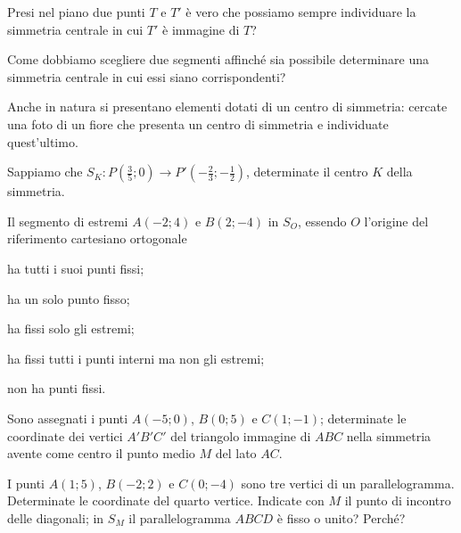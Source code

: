 \begin{esercizio}
\label{ese:8.4}
Presi nel piano due punti $T$ e $T'$ è vero che possiamo sempre 
individuare la simmetria centrale in cui $T'$ è immagine di $T$?
\end{esercizio}

\begin{esercizio}
\label{ese:8.5}
Come dobbiamo scegliere due segmenti affinché sia possibile 
determinare una simmetria centrale in cui essi siano corrispondenti?
\end{esercizio}

\begin{esercizio}
\label{ese:8.6}
Anche in natura si presentano elementi dotati di un centro di 
simmetria: cercate una foto di un fiore che presenta un centro di 
simmetria e individuate quest'ultimo.
\end{esercizio}

\begin{esercizio}
\label{ese:8.7}
Sappiamo che $S_K:P\left(\frac{3}{5};0\right) \rightarrow 
P'\left(-\frac{2}{3};-\frac{1}{2}\right)$, determinate il centro $K$ 
della simmetria. 
\end{esercizio}

\begin{esercizio}
\label{ese:8.8}
Il segmento di estremi $A(-2;4)$ e $B(2;-4)$ in $S_O$, essendo $O$ 
l'origine del riferimento cartesiano ortogonale
\begin{enumeratea}
\item ha tutti i suoi punti fissi;
\item ha un solo punto fisso;
\item ha fissi solo gli estremi;
\item ha fissi tutti i punti interni ma non gli estremi;
\item non ha punti fissi.
\end{enumeratea}
\end{esercizio}

\begin{esercizio}
\label{ese:8.9}
Sono assegnati i punti $A(-5;0)$, $B(0;5)$ e $C(1;-1)$; determinate 
le coordinate dei vertici $A'B'C'$ del triangolo immagine di $ABC$ 
nella simmetria avente come centro il punto medio $M$ del lato $AC$.
\end{esercizio}

\begin{esercizio}
\label{ese:8.10}
I punti $A(1;5)$, $B(-2;2)$ e $C(0;-4)$ sono tre vertici di un 
parallelogramma. Determinate le coordinate del quarto vertice. 
Indicate con $M$ il punto di incontro delle diagonali; in $S_M$ il 
parallelogramma $ABCD$ è fisso o unito? Perché?
\end{esercizio}

